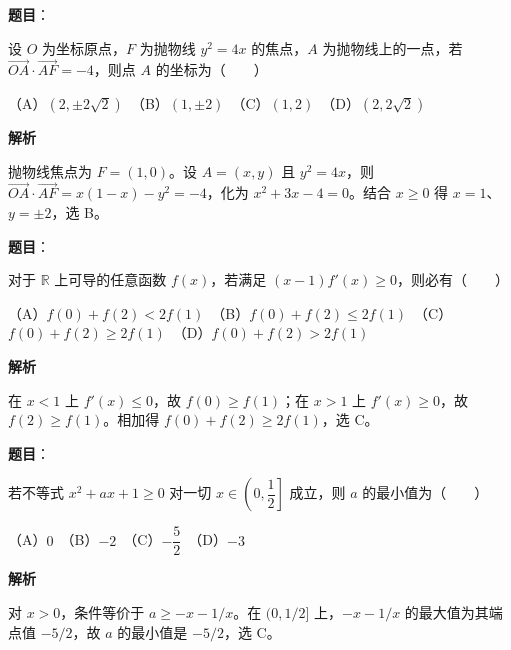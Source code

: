 \begin{answer}

\textbf{题目}：

设 $O$ 为坐标原点，$F$ 为抛物线 $y^2=4x$ 的焦点，$A$ 为抛物线上的一点，若 $\overrightarrow{OA}\cdot\overrightarrow{AF}=-4$，则点 $A$ 的坐标为\mbox{（　　）}

（A）$(2,\pm2\sqrt2)$　（B）$(1,\pm2)$　（C）$(1,2)$　（D）$(2,2\sqrt2)$

\textbf{解析}

抛物线焦点为 $F=(1,0)$。设 $A=(x,y)$ 且 $y^2=4x$，则 $\overrightarrow{OA}\cdot\overrightarrow{AF}=x(1-x)-y^2=-4$，化为 $x^2+3x-4=0$。结合 $x\ge0$ 得 $x=1$、$y=\pm2$，选 B。


\end{answer}
\begin{answer}

\textbf{题目}：

对于 $\mathbb R$ 上可导的任意函数 $f(x)$，若满足 $(x-1)f'(x)\geqslant0$，则必有\mbox{（　　）}

（A）$f(0)+f(2)<2f(1)$　（B）$f(0)+f(2)\leqslant2f(1)$　（C）$f(0)+f(2)\geqslant2f(1)$　（D）$f(0)+f(2)>2f(1)$

\textbf{解析}

在 $x<1$ 上 $f'(x)\le0$，故 $f(0)\ge f(1)$；在 $x>1$ 上 $f'(x)\ge0$，故 $f(2)\ge f(1)$。相加得 $f(0)+f(2)\ge2f(1)$，选 C。


\end{answer}
\begin{answer}

\textbf{题目}：

若不等式 $x^2+ax+1\geqslant0$ 对一切 $x\in\left(0,\dfrac12\right]$ 成立，则 $a$ 的最小值为\mbox{（　　）}

（A）$0$　（B）$-2$　（C）$-\dfrac52$　（D）$-3$

\textbf{解析}

对 $x>0$，条件等价于 $a\ge-x-1/x$。在 $(0,1/2]$ 上，$-x-1/x$ 的最大值为其端点值 $-5/2$，故 $a$ 的最小值是 $-5/2$，选 C。


\end{answer}
